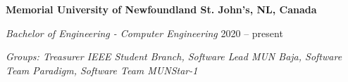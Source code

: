 \textbf{Memorial University of Newfoundland \hfill St. John's, NL, Canada} \par
\textit{Bachelor of Engineering - Computer Engineering} \hfill 2020 -- present\par
\textit{Groups: Treasurer IEEE Student Branch, Software Lead MUN Baja, Software Team Paradigm, Software Team MUNStar-1}
